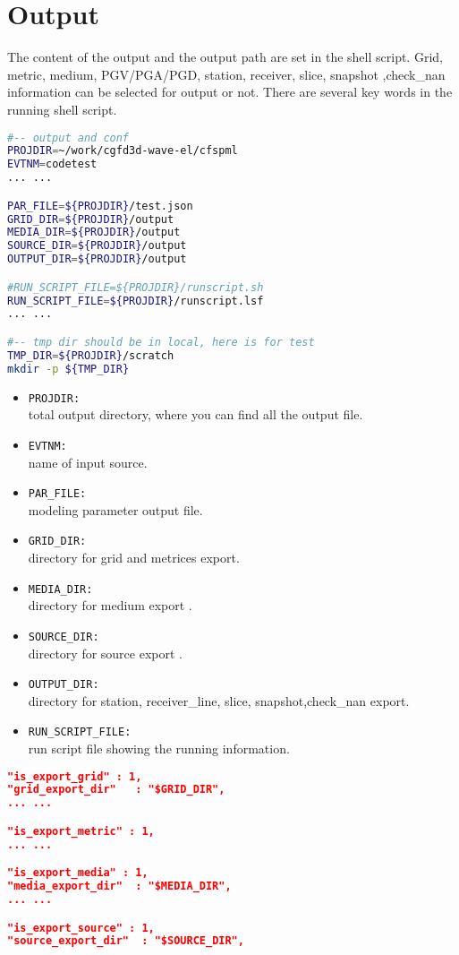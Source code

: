 \chapter{Output}\label{chap_output}
The content of the output and the output path are set in the shell script. Grid, metric, medium, PGV/PGA/PGD, station, receiver, slice, snapshot ,check\_nan information can be selected for output or not. There are several key words in the running shell script.
\begin{lstlisting}[language=bash,
	caption=OUTPUT\_DIR,
	label={outp},commentstyle=\color{codegreen},
	frame=tb]
#-- output and conf
PROJDIR=~/work/cgfd3d-wave-el/cfspml 
EVTNM=codetest
... ...

PAR_FILE=${PROJDIR}/test.json 
GRID_DIR=${PROJDIR}/output 
MEDIA_DIR=${PROJDIR}/output 
SOURCE_DIR=${PROJDIR}/output 
OUTPUT_DIR=${PROJDIR}/output 

#RUN_SCRIPT_FILE=${PROJDIR}/runscript.sh
RUN_SCRIPT_FILE=${PROJDIR}/runscript.lsf
... ...

#-- tmp dir should be in local, here is for test
TMP_DIR=${PROJDIR}/scratch
mkdir -p ${TMP_DIR}
\end{lstlisting}
\begin{itemize}
	\item \verb|PROJDIR:| \\
	total output directory, where you can find all the output file.
	\item \verb|EVTNM:| \\
	name of input source.
	\item \verb|PAR_FILE:| \\
	modeling parameter output file.
	\item \verb|GRID_DIR:| \\
	directory for grid and metrices export. 
	\item \verb|MEDIA_DIR:| \\
	directory for medium export .
	\item \verb|SOURCE_DIR:| \\
	directory for source export .
	\item \verb|OUTPUT_DIR:| \\
	directory for station, receiver\_line, slice, snapshot,check\_nan export.
	\item \verb|RUN_SCRIPT_FILE:| \\
	run script file showing the running information.
\end{itemize}

\begin{lstlisting}[language=json,
	caption=Example of export,
	label={outp},commentstyle=\color{codegreen},
	frame=tb]
"is_export_grid" : 1,
"grid_export_dir"   : "$GRID_DIR",
... ...

"is_export_metric" : 1,
... ...

"is_export_media" : 1,
"media_export_dir"  : "$MEDIA_DIR",
... ...

"is_export_source" : 1,
"source_export_dir"  : "$SOURCE_DIR",
\end{lstlisting}

